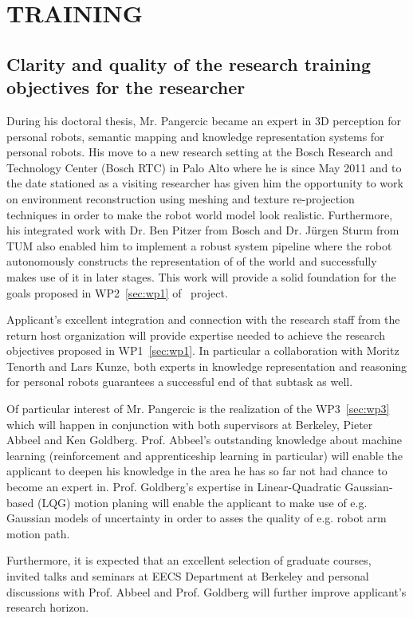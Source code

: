 \section{TRAINING} %
\label{sec:training}
\subsection{Clarity and quality of the research training objectives for the researcher}
During his doctoral thesis, Mr. Pangercic became an expert in 3D perception for personal robots, 
semantic mapping  and knowledge representation systems for personal robots. His move to a new 
research setting at the Bosch Research and Technology Center (Bosch RTC) in Palo Alto where he is since May 2011 and to the
date stationed as a visiting researcher has given him the opportunity to work on environment 
reconstruction using meshing and texture re-projection 
techniques in order to make the robot world model look realistic. Furthermore, his integrated work with 
Dr. Ben Pitzer from Bosch and Dr. J\"urgen Sturm from TUM also enabled him to implement 
a robust system pipeline where the robot autonomously constructs the representation of 
of the world and successfully makes use of it in later stages. This work will provide a solid
foundation for the goals proposed in WP2~\ref{sec:wp1} of \ksem\ project.

Applicant's excellent integration and connection with the research staff from the return
host organization will provide expertise needed to achieve the research objectives proposed
in WP1~\ref{sec:wp1}. In particular a collaboration with Moritz Tenorth and Lars Kunze, both
experts in knowledge representation and reasoning for personal robots guarantees a successful
end of that subtask as well.

Of particular interest of Mr. Pangercic is the realization of the WP3~\ref{sec:wp3} which
will happen in conjunction with both supervisors at Berkeley, Pieter Abbeel and Ken Goldberg.
Prof. Abbeel's outstanding knowledge about machine learning (reinforcement and apprenticeship
learning in particular) will enable the applicant to deepen his knowledge in the area he has
so far not had chance to become an expert in. Prof. Goldberg's expertise in Linear-Quadratic Gaussian-based 
(LQG) motion planing will enable the applicant to make use of e.g. Gaussian models of uncertainty in order to asses
the quality of e.g. robot arm motion path.

Furthermore, it is expected that an excellent selection of graduate courses, invited talks and 
seminars at EECS Department at Berkeley and personal discussions with Prof. Abbeel and Prof. 
Goldberg will further improve applicant's research horizon.
